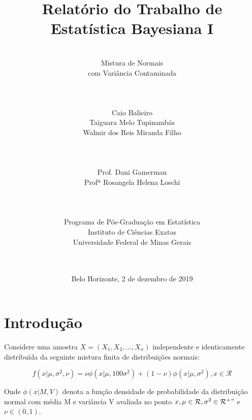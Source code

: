 \documentclass[12pt,reqno,a4paper,oneside]{report}
\begin{document}
\title{\huge Relatório do Trabalho de\\
	Estatística Bayesiana I}
\author{\\
	\huge Mistura de Normais\\
	\huge com Variância Contaminada
	\\
	\\
	\\
	\\
	\Large Caio Balieiro\\
	\Large Taiguara Melo Tupinambás\\
	\Large Walmir dos Reis Miranda Filho\\
	\\
	\\
	\\
	\Large Prof. Dani Gamerman\\
	\Large Profª Rosangela Helena Loschi\\
	\\
	\\
	\\
	Programa de Pós-Graduação em Estatística\\
	Instituto de Ciências Exatas\\
	Universidade Federal de Minas Gerais\\
	\\
	\\}
\date{Belo Horizonte, 2 de dezembro de 2019}
\maketitle

\section*{\Large Introdução}



Considere uma amostra $X = (X_{1}, X_{2}, ..., X_{n})$ independente e identicamente distribuída da seguinte mistura finita de distribuições normais:


\begin{equation}\label{eq:dist_amostral}
f(x|\mu,\sigma^2,\nu)=\nu\phi(x|\mu,100\sigma^2)+(1-\nu)\phi(x|\mu,\sigma^2), x\in\mathcal{R}
\end{equation}

Onde $\phi(x|M,V)$ denota a função densidade de probabilidade da distribuição normal com média M e variância V avaliada no ponto $x,\mu\in\mathcal{R},\sigma^2\in\mathcal{R^+}"$ e $\nu\in(0,1)$.
\end{document}

